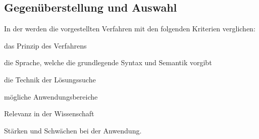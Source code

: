 \subsection{Gegenüberstellung und Auswahl}\label{subsec:gegenuberstellung-und-auswahl}

In der  werden die vorgestellten Verfahren mit den folgenden Kriterien verglichen:
\begin{itemize*}[label={}, itemjoin={,}, itemjoin*={{ sowie}}]
    \item das Prinzip des Verfahrens
    \item die Sprache, welche die grundlegende Syntax und Semantik vorgibt
    \item die Technik der Lösungssuche
    \item mögliche Anwendungsbereiche
    \item Relevanz in der Wissenschaft
    \item Stärken und Schwächen bei der Anwendung.
\end{itemize*}

